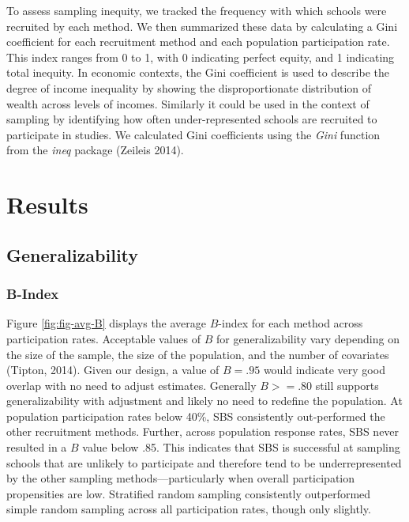 \documentclass[
  english,
  man,floatsintext]{apa6}
\begin{document}
 To assess sampling inequity, we tracked the frequency with which schools were recruited by each method. We then summarized these data by calculating a Gini coefficient for each recruitment method and each population participation rate. This index ranges from 0 to 1, with 0 indicating perfect equity, and 1 indicating total inequity. In economic contexts, the Gini coefficient is used to describe the degree of income inequality by showing the disproportionate distribution of wealth across levels of incomes. Similarly it could be used in the context of sampling by identifying how often under-represented schools are recruited to participate in studies. We calculated Gini coefficients using the \emph{Gini} function from the \emph{ineq} package (Zeileis 2014).

\hypertarget{results}{%
\section{Results}\label{results}}

\hypertarget{generalizability-1}{%
\subsection{Generalizability}\label{generalizability-1}}

\hypertarget{b-index}{%
\subsubsection{B-Index}\label{b-index}}

Figure \ref{fig:fig-avg-B} displays the average \(B\)-index for each method across participation rates. Acceptable values of \(B\) for generalizability vary depending on the size of the sample, the size of the population, and the number of covariates (Tipton, 2014). Given our design, a value of \(B = .95\) would indicate very good overlap with no need to adjust estimates. Generally \(B >= .80\) still supports generalizability with adjustment and likely no need to redefine the population. At population participation rates below 40\%, SBS consistently out-performed the other recruitment methods. Further, across population response rates, SBS never resulted in a \(B\) value below .85. This indicates that SBS is successful at sampling schools that are unlikely to participate and therefore tend to be underrepresented by the other sampling methods---particularly when overall participation propensities are low. Stratified random sampling consistently outperformed simple random sampling across all participation rates, though only slightly.
\end{document}
